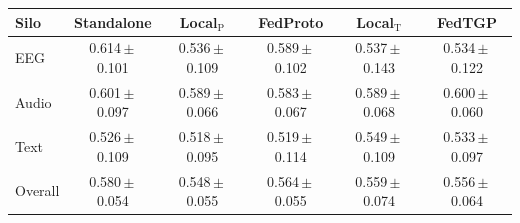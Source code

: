 \begin{tabular}{lccccc}
\toprule
\textbf{Silo} & \textbf{Standalone} & \textbf{Local$_{\mathrm{P}}$} & \textbf{FedProto} & \textbf{Local$_{\mathrm{T}}$} & \textbf{FedTGP} \\
\midrule
EEG & 0.614\,$\pm$\,0.101 & 0.536\,$\pm$\,0.109 & 0.589\,$\pm$\,0.102 & 0.537\,$\pm$\,0.143 & 0.534\,$\pm$\,0.122 \\
Audio & 0.601\,$\pm$\,0.097 & 0.589\,$\pm$\,0.066 & 0.583\,$\pm$\,0.067 & 0.589\,$\pm$\,0.068 & 0.600\,$\pm$\,0.060 \\
Text & 0.526\,$\pm$\,0.109 & 0.518\,$\pm$\,0.095 & 0.519\,$\pm$\,0.114 & 0.549\,$\pm$\,0.109 & 0.533\,$\pm$\,0.097 \\
\midrule
Overall & 0.580\,$\pm$\,0.054 & 0.548\,$\pm$\,0.055 & 0.564\,$\pm$\,0.055 & 0.559\,$\pm$\,0.074 & 0.556\,$\pm$\,0.064 \\
\bottomrule
\end{tabular}